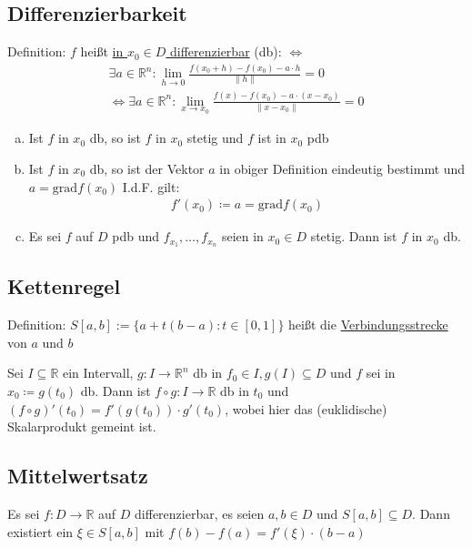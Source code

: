 \subsection{Differenzierbarkeit}
Definition: $f$ heißt \underline{in $x_0 \in D$ differenzierbar} (db): $\Leftrightarrow$
\begin{align*}
    \exists a \in \mathbb{R}^n: \lim \limits_{h \to 0} \frac{f(x_0+h) -f(x_0) - a\cdot h}{\lVert h \rVert} = 0 \\
    \Leftrightarrow \exists a \in \mathbb{R}^n : \lim \limits_{x \to x_0} \frac{f(x) -f(x_0) - a\cdot (x-x_0)}{\lVert x-x_0 \rVert} = 0
\end{align*}
\begin{enumerate}[a)]
    \item Ist $f$ in $x_0$ db, so ist $f$ in $x_0$ stetig und $f$ ist in $x_0$ pdb
    \item Ist $f$ in $x_0$ db, so ist der Vektor $a$ in obiger Definition eindeutig bestimmt und $a=\text{grad}f(x_0)$ I.d.F. gilt:
    \begin{align*}
        f'(x_0) \coloneqq a = \text{grad}f(x_0)
    \end{align*}
    \item Es sei $f$ auf $D$ pdb und $f_{x_1},\ldots,f_{x_n}$ seien in $x_0 \in D$ stetig. Dann ist $f$ in $x_0$ db.
\end{enumerate}

\subsection{Kettenregel}
Definition: $S[a, b] := \{a + t(b - a) : t \in [0, 1]\}$ heißt die \underline{Verbindungsstrecke} von $a$ und $b$

Sei $I \subseteq \mathbb{R}$ ein Intervall, $g: I \to \mathbb{R}^n$ db in $f_0 \in I, g(I) \subseteq D$ und $f$ sei in $x_0 \coloneqq g(t_0)$ db. 
Dann ist $f \circ g: I \to \mathbb{R}$ db in $t_0$ und $(f \circ g)' (t_0) = f'(g(t_0)) \cdot g'(t_0)$, wobei hier das (euklidische) Skalarprodukt gemeint ist.

\subsection{Mittelwertsatz}
Es sei $f: D \to \mathbb{R}$ auf $D$ differenzierbar, es seien $a,b \in D$ und $S[a,b] \subseteq D$. Dann existiert ein $\xi \in S[a,b]$ mit $f(b) - f(a) = f'(\xi) \cdot (b-a)$

